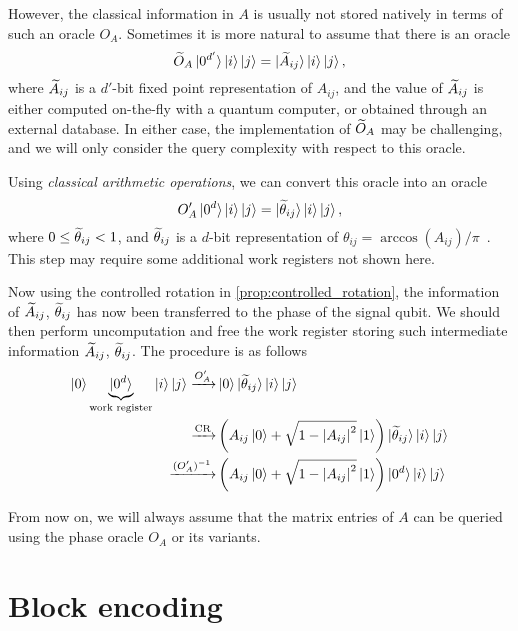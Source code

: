 However, the classical information in $A$ is usually not stored natively
in terms of such an oracle $O_A$. Sometimes it is more natural to assume that there is an oracle
\begin{equation}
\widetilde{O}_A\ket{0^{d'}}\ket{i}\ket{j}=\ket{\widetilde{A}_{ij}}\ket{i}\ket{j},
\end{equation}
where $\widetilde{A}_{ij}$ is a $d'$-bit fixed point representation of $A_{ij}$,
and the value of $\widetilde{A}_{ij}$ is either computed on-the-fly with a quantum computer, or obtained through an external database.
In either case, the implementation of $\widetilde{O}_A$ may be challenging, and we will only consider the query complexity with respect to this oracle.

Using \textit{classical arithmetic operations}, we can convert this oracle into an oracle
\begin{equation}
O'_A \ket{0^d}\ket{i}\ket{j}=\ket{\widetilde{\theta}_{ij}}\ket{i}\ket{j},
\end{equation}
where $0\le \widetilde{\theta}_{ij}< 1$, and $\widetilde{\theta}_{ij}$ is a $d$-bit representation of $\theta_{ij}=\arccos(A_{ij})/\pi$~. This step may require some additional work registers not shown here.


Now using the controlled rotation in \cref{prop:controlled_rotation}, the information of $\widetilde{A}_{ij}$, $\widetilde{\theta}_{ij}$ has now been transferred to the phase of the signal qubit. 
We should then perform uncomputation and free the work register storing such intermediate information $\widetilde{A}_{ij}$, $\widetilde{\theta}_{ij}$. The procedure is as follows 
\begin{equation}\label{eqn:matrixentry_access}
\begin{split}
\ket{0}\underbrace{\ket{0^d}}_{\text{work register}}\ket{i}\ket{j}\xrightarrow{O'_A} &\ket{0}\ket{\widetilde{\theta}_{ij}}\ket{i}\ket{j}\\
\xrightarrow{\operatorname{CR}}& \left(A_{ij}\ket{0}+\sqrt{1-\left\lvert A_{ij}\right\rvert^2}\ket{1}\right)\ket{\widetilde{\theta}_{ij}}\ket{i}\ket{j}\\
\xrightarrow{(O'_A)^{-1}}& \left(A_{ij}\ket{0}+\sqrt{1-\left\lvert A_{ij}\right\rvert^2}\ket{1}\right)\ket{0^d}\ket{i}\ket{j}
\end{split}
\end{equation}

From now on, we will always assume that the matrix entries of $A$ can be queried using the phase oracle $O_A$ or its variants.






\section{Block encoding}



